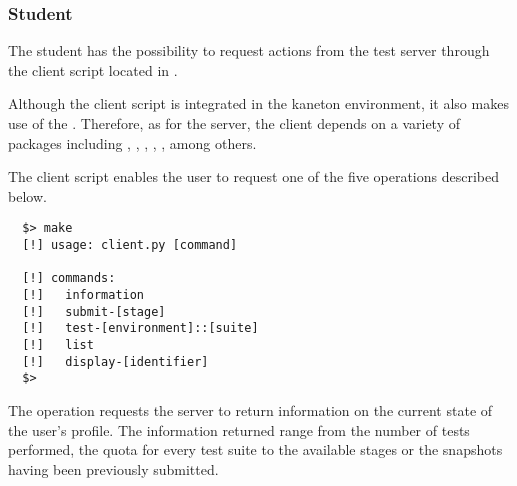 %
%
\subsubsection{Student}

The student has the possibility to request actions from the test server
through the client script located in .


Although the client script is integrated in the kaneton environment, it also
makes use of the . Therefore, as for the server, the client depends
on a variety of  packages including , ,
, , ,  among others.


The client script enables the user to request one of the five operations
described below.

\begin{verbatim}
  $> make
  [!] usage: client.py [command]

  [!] commands:
  [!]   information
  [!]   submit-[stage]
  [!]   test-[environment]::[suite]
  [!]   list
  [!]   display-[identifier]
  $>
\end{verbatim}

The  operation requests the server to return information
on the current state of the user's profile. The information returned range
from the number of tests performed, the quota for every test suite to the
available stages or the snapshots having been previously submitted.

